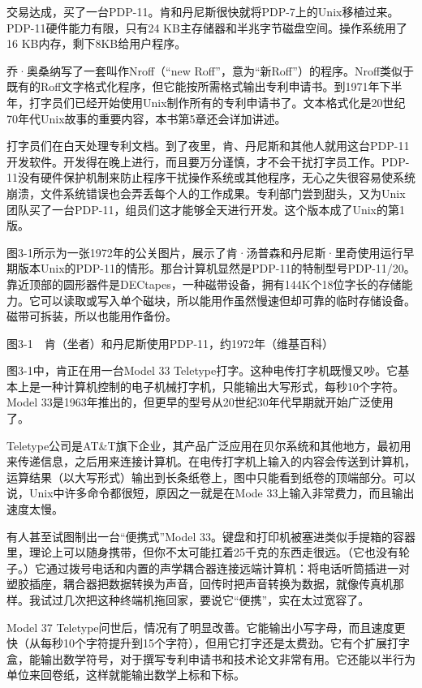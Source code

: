 \documentclass[a4paper,12pt,UTF8,twoside]{ctexbook}
\begin{document}
{交易达成，买了一台PDP-11。肯和丹尼斯很快就将PDP-7上的Unix移植过来。PDP-11硬件能力有限，只有24 KB主存储器和半兆字节磁盘空间。操作系统用了16 KB内存，剩下8KB给用户程序。

乔·奥桑纳写了一套叫作Nroff（“new Roff”，意为“新Roff”）的程序。Nroff类似于既有的Roff文字格式化程序，但它能按所需格式输出专利申请书。到1971年下半年，打字员们已经开始使用Unix制作所有的专利申请书了。文本格式化是20世纪70年代Unix故事的重要内容，本书第5章还会详加讲述。

打字员们在白天处理专利文档。到了夜里，肯、丹尼斯和其他人就用这台PDP-11开发软件。开发得在晚上进行，而且要万分谨慎，才不会干扰打字员工作。PDP-11没有硬件保护机制来防止程序干扰操作系统或其他程序，无心之失很容易使系统崩溃，文件系统错误也会弄丢每个人的工作成果。专利部门尝到甜头，又为Unix团队买了一台PDP-11，组员们这才能够全天进行开发。这个版本成了Unix的第1版。

图3-1所示为一张1972年的公关图片，展示了肯·汤普森和丹尼斯·里奇使用运行早期版本Unix的PDP-11的情形。那台计算机显然是PDP-11的特制型号PDP-11/20。靠近顶部的圆形器件是DECtapes，一种磁带设备，拥有144K个18位字长的存储能力。它可以读取或写入单个磁块，所以能用作虽然慢速但却可靠的临时存储设备。磁带可拆装，所以也能用作备份。



图3-1　肯（坐者）和丹尼斯使用PDP-11，约1972年（维基百科）

图3-1中，肯正在用一台Model 33 Teletype打字。这种电传打字机既慢又吵。它基本上是一种计算机控制的电子机械打字机，只能输出大写形式，每秒10个字符。Model 33是1963年推出的，但更早的型号从20世纪30年代早期就开始广泛使用了。

Teletype公司是AT\&T旗下企业，其产品广泛应用在贝尔系统和其他地方，最初用来传递信息，之后用来连接计算机。在电传打字机上输入的内容会传送到计算机，运算结果（以大写形式）输出到长条纸卷上，图中只能看到纸卷的顶端部分。可以说，Unix中许多命令都很短，原因之一就是在Mode 33上输入非常费力，而且输出速度太慢。

有人甚至试图制出一台“便携式”Model 33。键盘和打印机被塞进类似手提箱的容器里，理论上可以随身携带，但你不太可能扛着25千克的东西走很远。（它也没有轮子。）它通过拨号电话和内置的声学耦合器连接远端计算机：将电话听筒插进一对塑胶插座，耦合器把数据转换为声音，回传时把声音转换为数据，就像传真机那样。我试过几次把这种终端机拖回家，要说它“便携”，实在太过宽容了。

Model 37 Teletype问世后，情况有了明显改善。它能输出小写字母，而且速度更快（从每秒10个字符提升到15个字符），但用它打字还是太费劲。它有个扩展打字盒，能输出数学符号，对于撰写专利申请书和技术论文非常有用。它还能以半行为单位来回卷纸，这样就能输出数学上标和下标。

}
\end{document}
